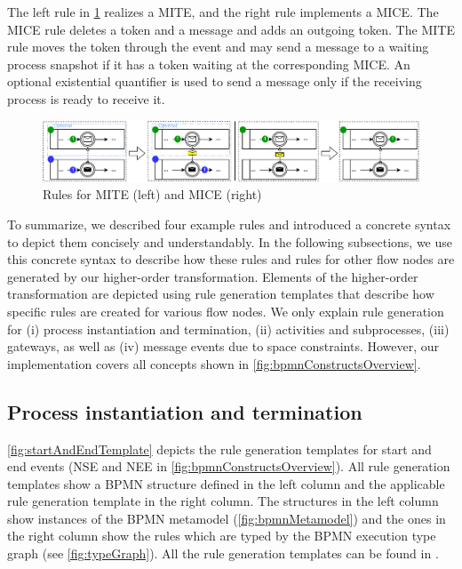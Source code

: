 \documentclass[submission, copyright, creativecommons]{eptcs}
\begin{document}
The left rule in \cref{fig:messageEventRules} realizes a MITE, and the right rule implements a MICE.
The MICE rule deletes a token and a message and adds an outgoing token.
The MITE rule moves the token through the event and may send a message to a waiting process snapshot if it has a token waiting at the corresponding MICE.
An optional existential quantifier is used to send a message only if the receiving process is ready to receive it.

\begin{figure}[h!]
    \centering
    \includegraphics[width=1\textwidth]{images/bpmn_semantics-message-events.pdf}
    \caption{Rules for MITE (left) and MICE (right)}
    \label{fig:messageEventRules}
\end{figure}

To summarize, we described four example rules and introduced a concrete syntax to depict them concisely and understandably.
In the following subsections, we use this concrete syntax to describe how these rules and rules for other flow nodes are generated by our higher-order transformation.
Elements of the higher-order transformation are depicted using rule generation templates that describe how specific rules are created for various flow nodes.
We only explain rule generation for (i) process instantiation and termination, (ii) activities and subprocesses, (iii) gateways, as well as (iv) message events due to space constraints.
However, our implementation covers all concepts shown in \cref{fig:bpmnConstructsOverview}.


\subsection{Process instantiation and termination} \label{subsec:instAndTermination}

\autoref{fig:startAndEndTemplate} depicts the rule generation templates for start and end events (\textsf{NSE} and \textsf{NEE} in \cref{fig:bpmnConstructsOverview}).
All rule generation templates show a BPMN structure defined in the left column and the applicable rule generation template in the right column.
The structures in the left column show instances of the BPMN metamodel (\cref{fig:bpmnMetamodel}) and the ones in the right column show the rules which are typed by the BPMN execution type graph (see \cref{fig:typeGraph}).
All the rule generation templates can be found in \cite{timkrauterArtifactsTERMGRAPH2022}.
\end{document}
